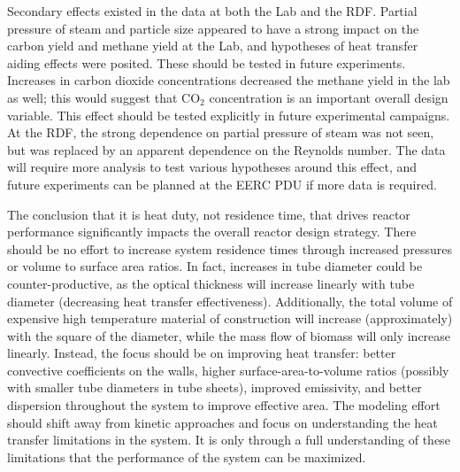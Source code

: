 \documentclass[11pt,twocolumn]{article}
\begin{document}
Secondary effects existed in the data at both the Lab and the RDF.  Partial pressure of steam and particle size appeared to have a strong impact on the carbon yield and methane yield at the Lab, and hypotheses of heat transfer aiding effects were posited.  These should be tested in future experiments.  Increases in carbon dioxide concentrations decreased the methane yield in the lab as well; this would suggest that CO$_2$ concentration is an important overall design variable.  This effect should be tested explicitly in future experimental campaigns.  At the RDF, the strong dependence on partial pressure of steam was not seen, but was replaced by an apparent dependence on the Reynolds number.  The data will require more analysis to test various hypotheses around this effect, and future experiments can be planned at the EERC PDU if more data is required.

The conclusion that it is heat duty, not residence time, that drives reactor performance significantly impacts the overall reactor design strategy.  There should be no effort to increase system residence times through increased pressures or volume to surface area ratios.  In fact, increases in tube diameter could be counter-productive, as the optical thickness will increase linearly with tube diameter (decreasing heat transfer effectiveness).  Additionally, the total volume of expensive high temperature material of construction will increase (approximately) with the square of the diameter, while the mass flow of biomass will only increase linearly.  Instead, the focus should be on improving heat transfer: better convective coefficients on the walls, higher surface-area-to-volume ratios (possibly with smaller tube diameters in tube sheets), improved emissivity, and better dispersion throughout the system to improve effective area.  The modeling effort should shift away from kinetic approaches and focus on understanding the heat transfer limitations in the system.  It is only through a full understanding of these limitations that the performance of the system can be maximized.

\newpage
\appendix
\onecolumn
\end{document}
